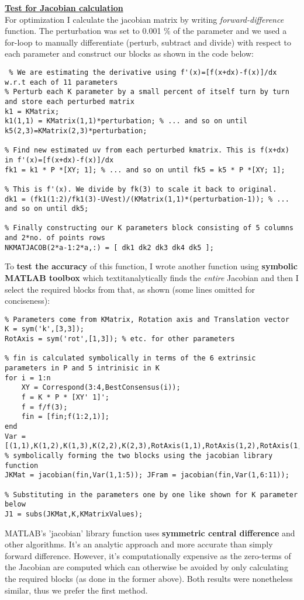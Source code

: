 \documentclass[titlepage]{article}
\begin{document}
\textbf{\underline{Test for Jacobian calculation}} \\
For optimization I calculate the jacobian matrix by writing \textit{forward-difference} function. The perturbation was set to 0.001 $\%$ of the parameter and we used a for-loop to manually differentiate (perturb, subtract and divide) with respect to each parameter and construct our blocks as shown in the code below:\singlespacing
\begin{lstlisting}
 % We are estimating the derivative using f'(x)=[f(x+dx)-f(x)]/dx w.r.t each of 11 parameters
% Perturb each K parameter by a small percent of itself turn by turn and store each perturbed matrix
k1 = KMatrix;
k1(1,1) = KMatrix(1,1)*perturbation; % ... and so on until k5(2,3)=KMatrix(2,3)*perturbation;
    
% Find new estimated uv from each perturbed kmatrix. This is f(x+dx) in f'(x)=[f(x+dx)-f(x)]/dx
fk1 = k1 * P *[XY; 1]; % ... and so on until fk5 = k5 * P *[XY; 1];
    
% This is f'(x). We divide by fk(3) to scale it back to original.
dk1 = (fk1(1:2)/fk1(3)-UVest)/(KMatrix(1,1)*(perturbation-1)); % ... and so on until dk5;
    
% Finally constructing our K parameters block consisting of 5 columns and 2*no. of points rows 
NKMATJACOB(2*a-1:2*a,:) = [ dk1 dk2 dk3 dk4 dk5 ];
\end{lstlisting}
To \textbf{test the accuracy} of this function, I wrote another function using \textbf{symbolic MATLAB toolbox} which textit{analytically} finds the \textit{entire} Jacobian and then I select the required blocks from that, as shown (some lines omitted for conciseness):
\begin{lstlisting}
% Parameters come from KMatrix, Rotation axis and Translation vector
K = sym('k',[3,3]);
RotAxis = sym('rot',[1,3]); % etc. for other parameters

% fin is calculated symbolically in terms of the 6 extrinsic parameters in P and 5 intrinisic in K
for i = 1:n
    XY = Correspond(3:4,BestConsensus(i));
    f = K * P * [XY' 1]';
    f = f/f(3);
    fin = [fin;f(1:2,1)];
end
Var = [(1,1),K(1,2),K(1,3),K(2,2),K(2,3),RotAxis(1,1),RotAxis(1,2),RotAxis(1,3),t(1,1),t(2,1),t(3,1)];
% symbolically forming the two blocks using the jacobian library function
JKMat = jacobian(fin,Var(1,1:5)); JFram = jacobian(fin,Var(1,6:11));

% Substituting in the parameters one by one like shown for K parameter below
J1 = subs(JKMat,K,KMatrixValues);
\end{lstlisting}
%
\doublespacing
MATLAB's 'jacobian' library function uses \textbf{symmetric central difference} and other algorithms. It's an analytic approach and more accurate than simply forward difference. However, it's computationally expensive as the zero-terms of the Jacobian are computed which can otherwise be avoided by only calculating the required blocks (as done in the former above). Both results were nonetheless similar, thus we prefer the first method.
%
\end{document}
